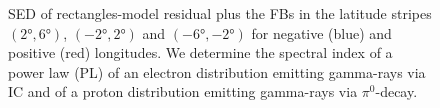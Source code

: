 \begin{figure}[h!]

  	\caption{SED of rectangles-model residual plus the FBs in the latitude stripes $(\ang{2}, \ang{6})$, $(\ang{-2}, \ang{2})$ and $(\ang{-6}, \ang{-2})$ for negative (blue) and positive (red) longitudes. We determine the spectral index of a power law (PL) of an electron distribution emitting gamma-rays via IC and of a proton distribution emitting gamma-rays via $\pi^0$-decay.}
  	\label{fig:SED_with_fits}
\end{figure}


